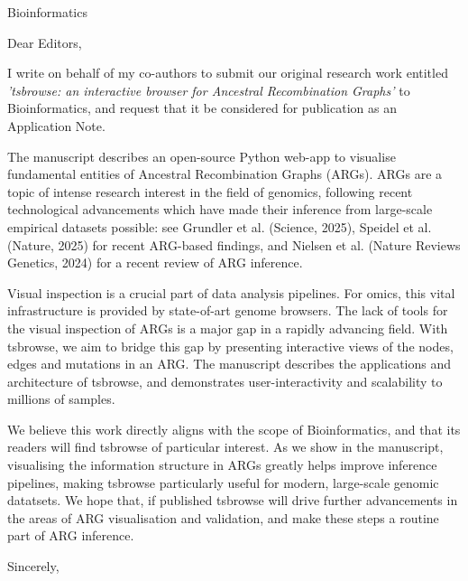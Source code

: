 \documentclass{letter}
\begin{document}
\begin{letter}{Bioinformatics}

    \opening{Dear Editors,}

    I write on behalf of my co-authors to submit our original research work
    entitled
    \emph{'tsbrowse: an interactive browser for Ancestral Recombination
        Graphs'} to
    Bioinformatics,
    and request that it be considered for publication as an Application Note.

    The manuscript describes an open-source Python web-app to visualise
    fundamental
    entities
    of Ancestral Recombination Graphs (ARGs). ARGs are a topic of intense
    research
    interest in the field of genomics, following recent technological
    advancements
    which have made their inference from large-scale empirical datasets
    possible: see Grundler et al. (Science, 2025), Speidel et al. (Nature,
    2025)
    for recent ARG-based findings, and Nielsen et al. (Nature Reviews Genetics,
    2024) for a recent review of ARG inference.
    
    Visual inspection is a crucial part of data analysis pipelines. For omics,
    this
    vital
    infrastructure is provided by state-of-art genome browsers. The lack of
    tools
    for the
    visual inspection of ARGs is a major gap in a rapidly advancing field. With
    tsbrowse,
    we aim to bridge this gap by presenting interactive views of the nodes,
    edges
    and mutations
    in an ARG. The manuscript describes the applications and architecture of
    tsbrowse, and
    demonstrates user-interactivity and scalability to millions of samples.

    We believe this work directly aligns with the scope of Bioinformatics, and
    that
    its
    readers will find tsbrowse of particular interest. As we show in the
    manuscript, visualising
    the information structure in ARGs greatly helps improve inference
    pipelines,
    making tsbrowse
    particularly useful for modern, large-scale genomic datatsets. We hope
    that, if
    published
    tsbrowse will drive further advancements in the areas of ARG visualisation
    and
    validation,
    and make these steps a routine part of ARG inference.

    \closing{Sincerely,}

\end{letter}
\end{document}
